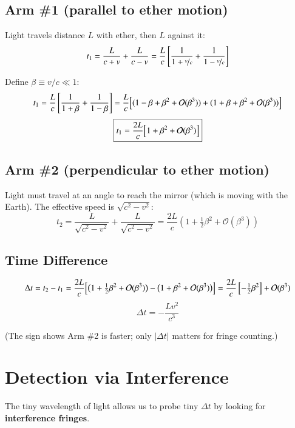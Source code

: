 \subsection*{Arm \#1 (parallel to ether motion)}

Light travels distance $L$ with ether, then $L$ against it:
\[
  t_1 = \frac{L}{c+v} + \frac{L}{c-v}
      = \frac{L}{c}\left[\frac{1}{1+\nicefrac{v}{c}} + \frac{1}{1-\nicefrac{v}{c}}\right]
\]

Define $\beta \equiv v/c \ll 1$:
\[
  t_1 = \frac{L}{c}\left[\frac{1}{1+\beta} + \frac{1}{1-\beta}\right]
      = \frac{L}{c}\Bigl[(1-\beta+\beta^2+\mathcal{O}(\beta^3))
                       + (1+\beta+\beta^2+\mathcal{O}(\beta^3))\Bigr]
\]
\[
  \boxed{t_1 = \frac{2L}{c}\Bigl[1 + \beta^2 + \mathcal{O}(\beta^3)\Bigr]}
\]

\subsection*{Arm \#2 (perpendicular to ether motion)}

Light must travel at an angle to reach the mirror (which is moving with the Earth).
The effective speed is $\sqrt{c^2-v^2}$:
\[
  t_2 = \frac{L}{\sqrt{c^2-v^2}} + \frac{L}{\sqrt{c^2-v^2}}
      = \frac{2L}{c}\left(1 + \tfrac{1}{2}\beta^2 + \mathcal{O}(\beta^3)\right)
\]

\subsection*{Time Difference}

\[
  \Delta t = t_2 - t_1
  = \frac{2L}{c}\Bigl[\bigl(1+\tfrac{1}{2}\beta^2+\mathcal{O}(\beta^3)\bigr)
                     - \bigl(1+\beta^2+\mathcal{O}(\beta^3)\bigr)\Bigr]
  = \frac{2L}{c}\left[-\tfrac{1}{2}\beta^2\right] + \mathcal{O}(\beta^3)
\]
\[
  \boxed{\Delta t = -\frac{Lv^2}{c^3}}
\]

(The sign shows Arm \#2 is faster; only $|\Delta t|$ matters for fringe counting.)

\section*{Detection via Interference}

The tiny wavelength of light allows us to probe tiny $\Delta t$ by looking for
\textbf{interference fringes}.

